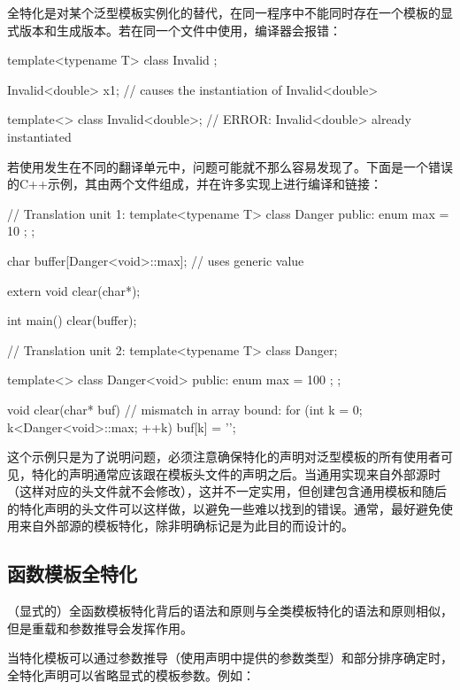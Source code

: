 全特化是对某个泛型模板实例化的替代，在同一程序中不能同时存在一个模板的显式版本和生成版本。若在同一个文件中使用，编译器会报错：

\begin{cpp}
template<typename T>
class Invalid {};

Invalid<double> x1; // causes the instantiation of Invalid<double>

template<>
class Invalid<double>; // ERROR: Invalid<double> already instantiated
\end{cpp}

若使用发生在不同的翻译单元中，问题可能就不那么容易发现了。下面是一个错误的C++示例，其由两个文件组成，并在许多实现上进行编译和链接：

\begin{cpp}
// Translation unit 1:
template<typename T>
class Danger {
	public:
	enum { max = 10 };
};

char buffer[Danger<void>::max]; // uses generic value

extern void clear(char*);

int main() {
	clear(buffer);
}

// Translation unit 2:
template<typename T>
class Danger;

template<>
class Danger<void> {
	public:
	enum { max = 100 };
};

void clear(char* buf) {
	// mismatch in array bound:
	for (int k = 0; k<Danger<void>::max; ++k) {
		buf[k] = '\0';
	}
}
\end{cpp}

这个示例只是为了说明问题，必须注意确保特化的声明对泛型模板的所有使用者可见，特化的声明通常应该跟在模板头文件的声明之后。当通用实现来自外部源时（这样对应的头文件就不会修改），这并不一定实用，但创建包含通用模板和随后的特化声明的头文件可以这样做，以避免一些难以找到的错误。通常，最好避免使用来自外部源的模板特化，除非明确标记是为此目的而设计的。

\subsection{函数模板全特化}

（显式的）全函数模板特化背后的语法和原则与全类模板特化的语法和原则相似，但是重载和参数推导会发挥作用。

当特化模板可以通过参数推导（使用声明中提供的参数类型）和部分排序确定时，全特化声明可以省略显式的模板参数。例如：



